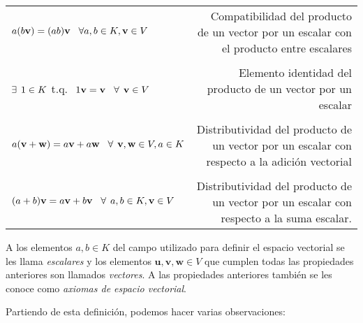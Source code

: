 \documentclass[12pt]{article}
\begin{document}
\begin{tcolorbox}
\begin{center}
\begin{tabular}{lr}
    \multirow{2}{0.35\textwidth}{$a(b\mathbf{v})=(ab)\mathbf{v}\hspace{3mm}\forall a,b\in K, \mathbf{v}\in V$} & \multirow{2}{0.47\textwidth}{Compatibilidad del producto de un vector por un escalar con el producto entre escalares} \\ \\ \\
    \multirow{2}{0.4\textwidth}{$\exists\hspace{1.5mm}1\in K$ \hspace{1.5mm} t.q. $\hspace{1.5mm}1\mathbf{v}=\mathbf{v}\hspace{3mm}\forall\hspace{1.5mm} \mathbf{v}\in V$} & \multirow{2}{0.35\textwidth}{Elemento identidad del producto de un vector por un escalar} \\ \\ \\
    \multirow{2}{0.4\textwidth}{$a(\mathbf{v}+\mathbf{w})=a\mathbf{v}+a\mathbf{w}\hspace{3mm}\forall\hspace{1.5mm} \mathbf{v},\mathbf{w}\in V, a\in K$} & \multirow{2}{0.47\textwidth}{Distributividad del producto de un vector por un escalar con respecto a la adición vectorial}  \\ \\ \\
    \multirow{2}{0.4\textwidth}{$(a+b)\mathbf{v}=a\mathbf{v}+b\mathbf{v}\hspace{3mm}\forall\hspace{1.5mm} a,b\in K, \mathbf{v}\in V$} & \multirow{2}{0.47\textwidth}{Distributividad del producto de un vector por un escalar con respecto a la suma escalar.} \\ \\
\end{tabular}
\end{center}

\hspace{2.5mm} A los elementos $a,b \in K$ del campo utilizado para definir el espacio vectorial se les llama \textit{escalares} y los elementos $\mathbf{u},\mathbf{v},\mathbf{w}\in V$ que cumplen todas las propiedades anteriores son llamados \textit{vectores}. A las propiedades anteriores también se les conoce como \textit{axiomas de espacio vectorial}.

\end{tcolorbox}

Partiendo de esta definición, podemos hacer varias observaciones:
\end{document}
